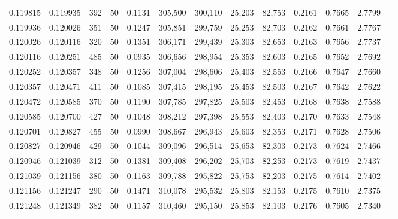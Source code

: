 \begin{tabular}{rrrrrrrrrrrrr}
0.119815 & 0.119935 &   392 &  50 &                                     0.1131 & 305,500 & 300,110 &  25,203 &  82,753 & 0.2161 & 0.7665 & 2.7799 \\
0.119936 & 0.120026 &   351 &  50 &                                     0.1247 & 305,851 & 299,759 &  25,253 &  82,703 & 0.2162 & 0.7661 & 2.7767 \\
0.120026 & 0.120116 &   320 &  50 &                                     0.1351 & 306,171 & 299,439 &  25,303 &  82,653 & 0.2163 & 0.7656 & 2.7737 \\
0.120116 & 0.120251 &   485 &  50 &                                     0.0935 & 306,656 & 298,954 &  25,353 &  82,603 & 0.2165 & 0.7652 & 2.7692 \\
0.120252 & 0.120357 &   348 &  50 &                                     0.1256 & 307,004 & 298,606 &  25,403 &  82,553 & 0.2166 & 0.7647 & 2.7660 \\
0.120357 & 0.120471 &   411 &  50 &                                     0.1085 & 307,415 & 298,195 &  25,453 &  82,503 & 0.2167 & 0.7642 & 2.7622 \\
0.120472 & 0.120585 &   370 &  50 &                                     0.1190 & 307,785 & 297,825 &  25,503 &  82,453 & 0.2168 & 0.7638 & 2.7588 \\
0.120585 & 0.120700 &   427 &  50 &                                     0.1048 & 308,212 & 297,398 &  25,553 &  82,403 & 0.2170 & 0.7633 & 2.7548 \\
0.120701 & 0.120827 &   455 &  50 &                                     0.0990 & 308,667 & 296,943 &  25,603 &  82,353 & 0.2171 & 0.7628 & 2.7506 \\
0.120827 & 0.120946 &   429 &  50 &                                     0.1044 & 309,096 & 296,514 &  25,653 &  82,303 & 0.2173 & 0.7624 & 2.7466 \\
0.120946 & 0.121039 &   312 &  50 &                                     0.1381 & 309,408 & 296,202 &  25,703 &  82,253 & 0.2173 & 0.7619 & 2.7437 \\
0.121039 & 0.121156 &   380 &  50 &                                     0.1163 & 309,788 & 295,822 &  25,753 &  82,203 & 0.2175 & 0.7614 & 2.7402 \\
0.121156 & 0.121247 &   290 &  50 &                                     0.1471 & 310,078 & 295,532 &  25,803 &  82,153 & 0.2175 & 0.7610 & 2.7375 \\
0.121248 & 0.121349 &   382 &  50 &                                     0.1157 & 310,460 & 295,150 &  25,853 &  82,103 & 0.2176 & 0.7605 & 2.7340 \\

\end{tabular}
